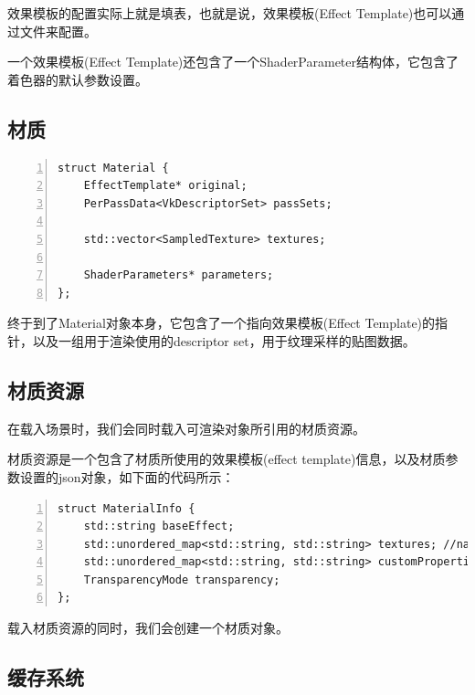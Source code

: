 \documentclass{ctexart}
\begin{document}
效果模板的配置实际上就是填表，也就是说，效果模板(Effect Template)也可以通过文件来配置。

一个效果模板(Effect Template)还包含了一个ShaderParameter结构体，它包含了着色器的默认参数设置。

\subsection{材质}


\begin{lstlisting}[language={[ANSI]C},keywordstyle=\color{blue!70},commentstyle=\color{red!50!green!50!blue!50},frame=shadowbox, rulesepcolor=\color{red!20!green!20!blue!20},basicstyle=\small,numbers=left, numberstyle=\tiny,breaklines=true]
	struct Material {
	EffectTemplate* original;
	PerPassData<VkDescriptorSet> passSets;

	std::vector<SampledTexture> textures;

	ShaderParameters* parameters;
};
\end{lstlisting}

终于到了Material对象本身，它包含了一个指向效果模板(Effect Template)的指针，以及一组用于渲染使用的descriptor set，用于纹理采样的贴图数据。

\subsection{材质资源}

在载入场景时，我们会同时载入可渲染对象所引用的材质资源。

材质资源是一个包含了材质所使用的效果模板(effect template)信息，以及材质参数设置的json对象，如下面的代码所示：


\begin{lstlisting}[language={[ANSI]C},keywordstyle=\color{blue!70},commentstyle=\color{red!50!green!50!blue!50},frame=shadowbox, rulesepcolor=\color{red!20!green!20!blue!20},basicstyle=\small,numbers=left, numberstyle=\tiny,breaklines=true]
struct MaterialInfo {
	std::string baseEffect;
	std::unordered_map<std::string, std::string> textures; //name -> path
	std::unordered_map<std::string, std::string> customProperties;
	TransparencyMode transparency;
};
\end{lstlisting}

载入材质资源的同时，我们会创建一个材质对象。

\subsection{缓存系统}
\end{document}
